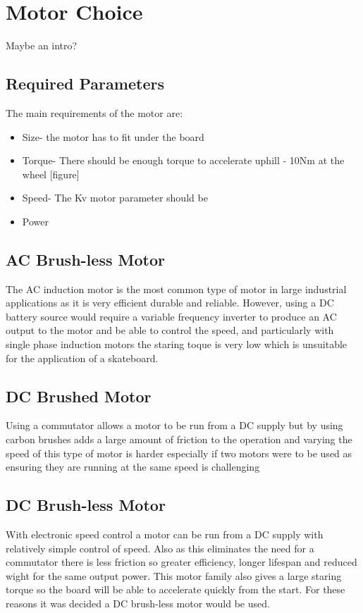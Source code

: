 \documentclass{article}
\begin{document}
\section{Motor Choice}
Maybe an intro? 

\subsection{Required Parameters}
The main requirements of the motor are:
\begin{itemize}
	\item Size- the motor has to fit under the board
	\item Torque- There should be enough torque to accelerate uphill - 10Nm at the wheel [figure]
	\item Speed- The Kv motor parameter should be 
	\item Power
\end{itemize}

\subsection{AC Brush-less Motor}
The AC induction motor is the most common type of motor in large industrial applications as it is very efficient durable and reliable. However, using a DC battery source would require a variable frequency inverter to produce an AC output to the motor and be able to control the speed, and particularly with single phase induction motors the staring toque is very low which is unsuitable for the application of a skateboard. 

\subsection{DC Brushed Motor}
Using a commutator allows a motor to be run from a DC supply but by using carbon brushes adds a large amount of friction to the operation and varying the speed of this type of motor is harder especially if two motors were to be used as ensuring they are running at the same speed is challenging

\subsection{DC Brush-less Motor}
With electronic speed control a motor can be run from a DC supply with relatively simple control of speed. Also as this eliminates the need for a commutator there is less friction so greater efficiency, longer lifespan and reduced wight for the same output power. This motor family also gives a large staring torque so the board will be able to accelerate quickly from the start. For these reasons it was decided a DC brush-less motor would be used.
\end{document}
